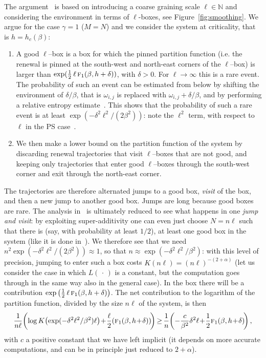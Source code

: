 \documentclass[AHL,Unicode,longabstracts]{cedram}
\newcommand{\ga}{\alpha}
\newcommand{\gb}{\beta}
\newcommand{\gd}{\delta}
\newcommand{\go}{\omega}
\newcommand{\tf}{\textsc{f}} %
\newcommand{\bbN}{\ensuremath{\mathbb{N}}}
\newcommand*{\Mk}{\mkern -2mu}
\begin{document}
The argument~\cite{cf:GT06} is based on introducing a coarse graining scale $\ell \in \bbN$ and considering the environment in terms of $\ell$-boxes, see Figure~\ref{fig:smoothing}. We argue for the case $\gamma=1$ ($M=N$) and we consider the system at criticality, that is $h=h_c(\gb)$:
\begin{enumerate}
\item A good $\ell$--box is a box for which the pinned partition function (i.e. the renewal is pinned at the south-west and north-east corners of the $\ell$--box) is larger than $\exp(\tfrac12\,\ell\,\tf_1(\gb, h+ \gd))$, with $\gd>0$. For $\ell\to \infty$ this is a rare event. The probability of such an event can be estimated from below by shifting the environment of $\gd/\gb$, that is $\go_{i,j}$ is replaced with $\go_{i,j}+ \gd/\gb$, and by performing a relative entropy estimate~\cite[Chapter~5]{cf:G}. This shows that the probability of such a rare event is at least $\exp(-\gd^2 \ell^2 /(2 \gb^2))$: note the $\ell^2$ term, with respect to $\ell$ in the PS case~\cite{cf:GT06}.
\item We then make a lower bound on the partition function of the system by discarding renewal trajectories that visit $\ell$--boxes that are not good, and keeping only trajectories that enter good $\ell$--boxes through the south-west corner and exit through the north-east corner.
\end{enumerate}


The trajectories are therefore alternated jumps to a good box, \emph{visit} of the box, and then a new jump to another good box. Jumps are long because good boxes are rare. The analysis in~\cite{cf:GT06} is ultimately reduced to see what happens in one \emph{jump and visit}: by exploiting super-additivity one can even just choose $N=n\ell$ such that there is (say, with probability at least $1/2$), at least one good box in the system (like it is done in~\cite{cf:BL11}). We therefore see that we need $n^2 \exp(-\gd^2 \ell^2 /(2 \gb^2))\approx 1$, so that $n \approx \exp(-\gd^2 \ell^2 / \gb^2)$: with this level of precision, jumping to enter such a box costs $K(n\ell) = (n\ell)^{-(2+\ga)}$ (let us consider the case in which $L({\,\cdot\,})$ is a constant, but the computation goes through in the same way also in the general case). In the box there will be a contribution $\exp\big(\tfrac12\,\ell\,\tf_1(\gb, h+ \gd) \big)$. The net contribution to the logarithm of the partition function, divided by the size $n\ell$ of the system, is then
\begin{equation}
\!\frac{1}{n \ell} \!\left(\log K\!\left(\exp(-\gd^2 \ell^2 / \gb^2) \ell \right)\!+\! \frac{\ell}{2} (\tf_1(\gb, h\!+\! \gd))\! \right) \Mk\ge\Mk \frac {1}{n} \!\left(-\frac{c}{\gb^2}\gd^2 \ell\!+\! \frac{1}{2} \tf_1(\gb, h\!+\! \gd)\! \right),\!
\end{equation}
with $c$ a positive constant that we have left implicit (it depends on more accurate computations, and can be in principle just reduced to $2+ \ga$).
\end{document}
